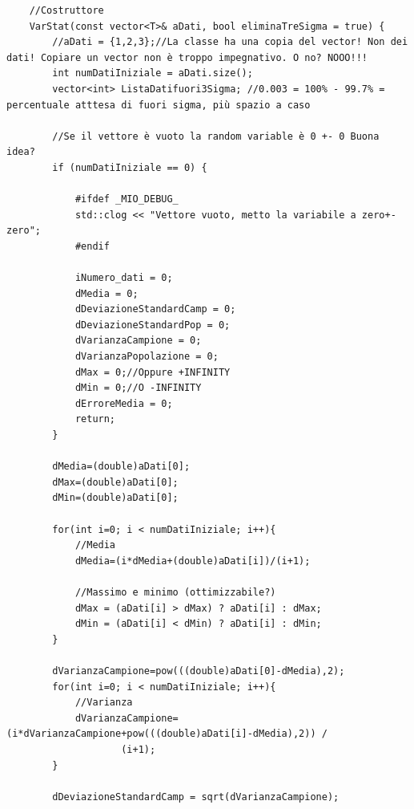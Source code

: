 \documentclass[12pt]{article} %
\begin{document}
\begin{verbatim}
	//Costruttore
	VarStat(const vector<T>& aDati, bool eliminaTreSigma = true) {
		//aDati = {1,2,3};//La classe ha una copia del vector! Non dei dati! Copiare un vector non è troppo impegnativo. O no? NOOO!!!
		int numDatiIniziale = aDati.size();
		vector<int> ListaDatifuori3Sigma; //0.003 = 100% - 99.7% = percentuale atttesa di fuori sigma, più spazio a caso

		//Se il vettore è vuoto la random variable è 0 +- 0 Buona idea?
		if (numDatiIniziale == 0) {

			#ifdef _MIO_DEBUG_
			std::clog << "Vettore vuoto, metto la variabile a zero+-zero";
			#endif

			iNumero_dati = 0;
			dMedia = 0;
			dDeviazioneStandardCamp = 0;
			dDeviazioneStandardPop = 0;
			dVarianzaCampione = 0;
			dVarianzaPopolazione = 0;
			dMax = 0;//Oppure +INFINITY
			dMin = 0;//O -INFINITY
			dErroreMedia = 0;
			return;
		}

		dMedia=(double)aDati[0];
		dMax=(double)aDati[0];
		dMin=(double)aDati[0];

		for(int i=0; i < numDatiIniziale; i++){
			//Media
			dMedia=(i*dMedia+(double)aDati[i])/(i+1);

			//Massimo e minimo (ottimizzabile?)
			dMax = (aDati[i] > dMax) ? aDati[i] : dMax;
			dMin = (aDati[i] < dMin) ? aDati[i] : dMin;
		}

		dVarianzaCampione=pow(((double)aDati[0]-dMedia),2);
		for(int i=0; i < numDatiIniziale; i++){
			//Varianza
			dVarianzaCampione=(i*dVarianzaCampione+pow(((double)aDati[i]-dMedia),2)) /
					(i+1);
		}

		dDeviazioneStandardCamp = sqrt(dVarianzaCampione);


\end{verbatim}
\end{document}
